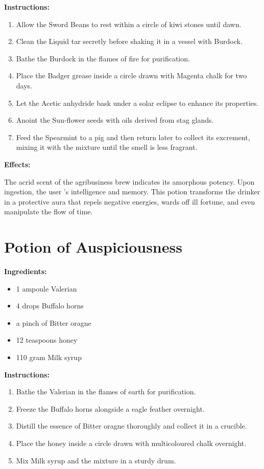 \documentclass{article}
\begin{document}
\textbf{Instructions:}

\begin{enumerate}
  \item Allow the Sword Beans to rest within a circle of kiwi stones until dawn.
  \item Clean the Liquid tar secretly before shaking it in a vessel with Burdock.
  \item Bathe the Burdock in the flames of fire for purification.
  \item Place the Badger grease inside a circle drawn with Magenta chalk for two days.
  \item Let the Acetic anhydride bask under a solar eclipse to enhance its properties.
  \item Anoint the Sun-flower seeds with oils derived from stag glands.
  \item Feed the Spearmint to a pig and then return later to collect its excrement, mixing it with the mixture until the smell is less fragrant.
\end{enumerate}

\textbf{Effects:}

The acrid scent of the agribusiness brew indicates its amorphous potency. Upon ingestion, the user 's intelligence and memory. This potion transforms the drinker in a protective aura that repels negative energies, wards off ill fortune, and even manipulate the flow of time.

\newpage
\section*{Potion of Auspiciousness}

\textbf{Ingredients:}

\begin{itemize}
  \item 1 ampoule Valerian
  \item 4 drops Buffalo horns
  \item a pinch of Bitter oragne
  \item 12 teaspoons honey
  \item 110 gram Milk syrup
\end{itemize}

\textbf{Instructions:}

\begin{enumerate}
  \item Bathe the Valerian in the flames of earth for purification.
  \item Freeze the Buffalo horns alongside a eagle feather overnight.
  \item Distill the essence of Bitter oragne thoroughly and collect it in a crucible.
  \item Place the honey inside a circle drawn with multicoloured chalk overnight.
  \item Mix Milk syrup and the mixture in a sturdy drum.
\end{enumerate}
\end{document}
